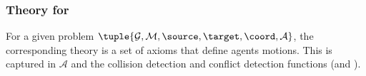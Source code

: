 


\subsubsection{Theory for \mapfr}
For a given \mapfr problem $\tuple{\mathcal{G}, \mathcal{M}, \source, \target, \coord, \mathcal{A}}$, the corresponding theory is a set of axioms that define agents motions. 
This is captured in $\mathcal{A}$ and the collision detection and conflict detection functions (\iscollision and \inconflict). 



